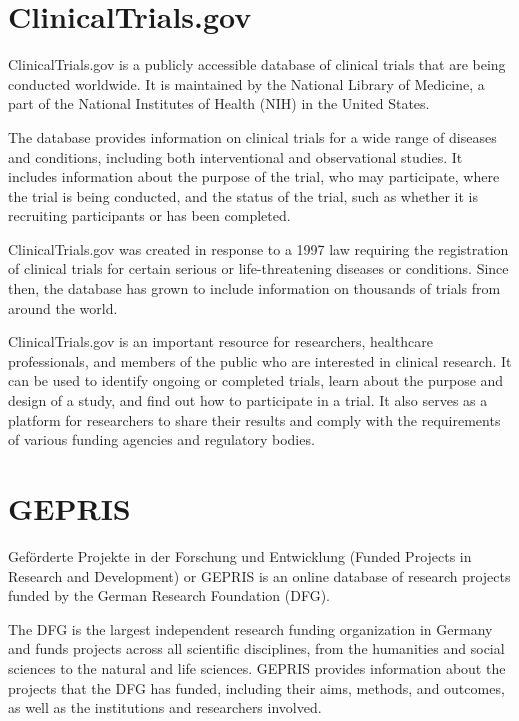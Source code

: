 \documentclass[
]{book}
\begin{document}
\hypertarget{clinicaltrials.gov}{%
\section{ClinicalTrials.gov}\label{clinicaltrials.gov}}

ClinicalTrials.gov is a publicly accessible database of clinical trials that are being conducted worldwide. It is maintained by the National Library of Medicine, a part of the National Institutes of Health (NIH) in the United States.

The database provides information on clinical trials for a wide range of diseases and conditions, including both interventional and observational studies. It includes information about the purpose of the trial, who may participate, where the trial is being conducted, and the status of the trial, such as whether it is recruiting participants or has been completed.

ClinicalTrials.gov was created in response to a 1997 law requiring the registration of clinical trials for certain serious or life-threatening diseases or conditions. Since then, the database has grown to include information on thousands of trials from around the world.

ClinicalTrials.gov is an important resource for researchers, healthcare professionals, and members of the public who are interested in clinical research. It can be used to identify ongoing or completed trials, learn about the purpose and design of a study, and find out how to participate in a trial. It also serves as a platform for researchers to share their results and comply with the requirements of various funding agencies and regulatory bodies.

\hypertarget{gepris}{%
\section{GEPRIS}\label{gepris}}

Geförderte Projekte in der Forschung und Entwicklung (Funded Projects in Research and Development) or GEPRIS is an online database of research projects funded by the German Research Foundation (DFG).

The DFG is the largest independent research funding organization in Germany and funds projects across all scientific disciplines, from the humanities and social sciences to the natural and life sciences. GEPRIS provides information about the projects that the DFG has funded, including their aims, methods, and outcomes, as well as the institutions and researchers involved.
\end{document}
